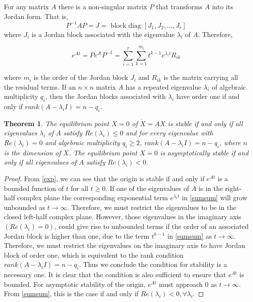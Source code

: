 \documentclass{article}
\newtheorem{theorem}{Theorem}
\begin{document}
For any matrix $A$ there is a non-singular matrix $P$ that transforms $A$ into its Jordan form. That is, 
$$P^{-1}AP = J = \text{ block diag }[J_1,J_2,\dots,J_r]$$
where $J_i$ is a Jordan block associated with the eigenvalue $\lambda_i$ of $A.$ Therefore,

\begin{equation}\label{sumsum}
    e^{At} = Pe^{Jt}P^{-1} = \sum_{i=1}^r\sum_{k=1}^{m_i}t^{k-1}e^{\lambda_i t}R_{ik}
\end{equation}


where $m_i$ is the order of the Jordan block $J_i$ and $R_{ik}$ is the matrix carrying all the residual terms. If an $n\times n$ matrix $A$ has a repeated eigenvalue $\lambda_i$ of algebraic multiplicity $q_i$, then the Jordan blocks associated with $\lambda_i$ have order one if and only if $rank(A-\lambda_i I) = n-q_i.$

\begin{theorem}\label{t1}
    The equilibrium point $X=0$ of $\dot{X}=AX$ is stable if and only if all eigenvalues $\lambda_i$ of $A$ satisfy $Re(\lambda_i)\leq0$ and for every eigenvalue with $Re(\lambda_i)=0$ and algebraic multiplicity $q_i\geq 2$, $rank(A-\lambda_i I)=n-q_i$, where $n$ is the dimension of $X$.  The equilibrium point $X=0$ is asymptotically stable if and only if all eigenvalues of $A$ satisfy $Re(\lambda_i)<0$.

\end{theorem}

\begin{proof}
    From \eqref{exp}, we can see that the origin is stable if and only if $e^{At}$ is a bounded function of $t$ for all $t\geq 0$. If one of the eigenvalues of $A$ is in the right-half complex plane the corresponding exponential term $e^{\lambda_i t}$ in \eqref{sumsum} will grow unbounded as $t\to \infty.$ Therefore, we must restrict the eigenvalues to be in the closed left-half complex plane. However, those eigenvalues in the imaginary axis $(Re(\lambda_i)=0)$, could give rise to unbounded terms if the order of an associated Jordan block is higher than one, due to the term $t^{k-1}$ in \eqref{sumsum} as $t\to\infty$. Therefore, we must restrict the eigenvalues on the imaginary axis to have Jordan block of order one, which is equivalent to the rank condition $rank(A-\lambda_i I) = n-q_i$. Thus we conclude the condition for stability is a necessary one. It is clear that the condition is also sufficient to ensure that $e^{At}$ is bounded. For asymptotic stability of the origin, $e^{At}$ must approach $0$ as $t\to\infty.$ From \eqref{sumsum}, this is the case if and only if $Re(\lambda_i)<0, \forall \lambda_i.$
\end{proof}
\end{document}
